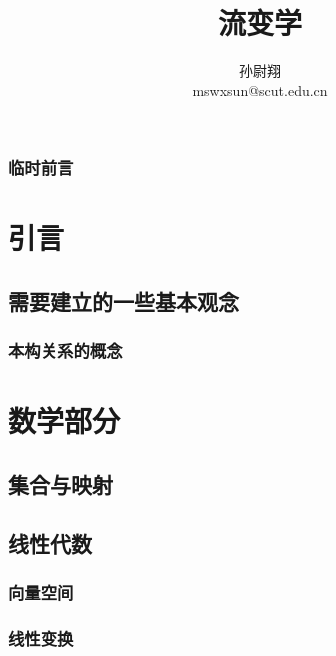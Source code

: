 \documentclass[zihao=-4,linespread=1.5,a4paper,heading=true,twoside]{ctexbook}
\title{流变学}
\author{孙尉翔\\mswxsun@scut.edu.cn}
\theoremstyle{definition}
\theoremstyle{plain}
\begin{document}
\maketitle

\frontmatter
{}
\section*{临时前言}\label{sec:preface}


\tableofcontents
\mainmatter
{}

\part{引言}
\chapter{需要建立的一些基本观念}\label{sec:I}
\section{本构关系的概念}\label{sec:I.1}
\label{sec:I.1.1}

\part{数学部分}\label{sec:II}
\chapter{集合与映射}\label{sec:II.1}
\label{sec:II.1.1}
\label{sec:II.1.2}
\label{sec:II.1.3}

\chapter{线性代数}\label{sec:II.2}
\section{向量空间}\label{sec:II.2.1}


\section{线性变换}\label{sec:II.2.2}
\end{document}

